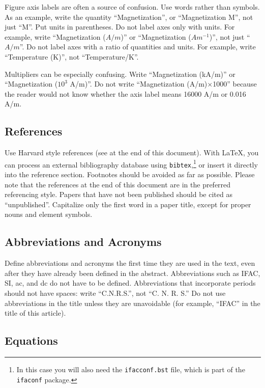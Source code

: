 \documentclass{ifacconf}
\begin{document}
Figure axis labels are often a source of confusion. Use words rather
than symbols. As an example, write the quantity ``Magnetization'', or
``Magnetization M'', not just ``M''. Put units in parentheses. Do not
label axes only with units.  For example, write ``Magnetization
($A/m$)'' or ``Magnetization ($A m^{-1}$)'', not just ``$A/m$''. Do not
label axes with a ratio of quantities and units. For example, write
``Temperature (K)'', not ``Temperature/K''.

Multipliers can be especially confusing. Write ``Magnetization
(kA/m)'' or ``Magnetization ($10^3$ A/m)''. Do not write
``Magnetization (A/m)$\times$1000'' because the reader would not know
whether the axis label means 16000 A/m or 0.016 A/m. 

\subsection{References}

Use Harvard style references (see at the end of this document). With
\LaTeX, you can process an external bibliography database 
using \texttt{bibtex},\footnote{In this case you will also need the \texttt{ifacconf.bst}
file, which is part of the \texttt{ifaconf} package.}
or insert it directly into the reference section. Footnotes should be avoided as
far as possible.  Please note that the references at the end of this
document are in the preferred referencing style. Papers that have not
been published should be cited as ``unpublished''.  Capitalize only the
first word in a paper title, except for proper nouns and element
symbols.

\subsection{Abbreviations and Acronyms}

Define abbreviations and acronyms the first time they are used in the
text, even after they have already been defined in the
abstract. Abbreviations such as IFAC, SI, ac, and dc do not have to be
defined. Abbreviations that incorporate periods should not have
spaces: write ``C.N.R.S.'', not ``C. N. R. S.'' Do not use abbreviations
in the title unless they are unavoidable (for example, ``IFAC'' in the
title of this article).

\subsection{Equations}
\end{document}
